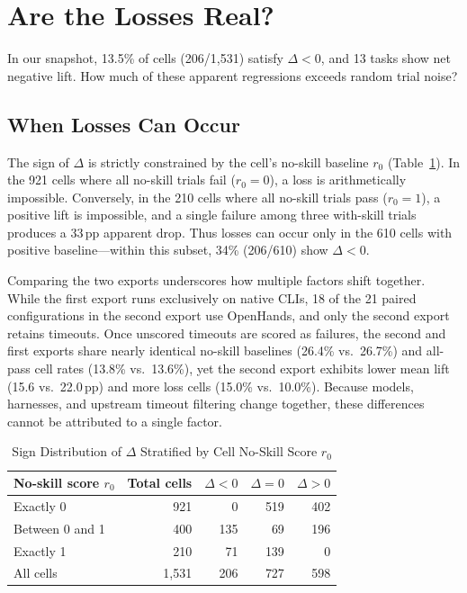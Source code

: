 \documentclass[10pt,conference]{IEEEtran}
\begin{document}
\section{Are the Losses Real?}
\label{sec:loss}
In our snapshot, 13.5\% of cells (206/1,531) satisfy $\Delta<0$, and 13 tasks show net negative lift. How much of these apparent regressions exceeds random trial noise?

\subsection{When Losses Can Occur}
The sign of $\Delta$ is strictly constrained by the cell's no-skill baseline $r_{0}$ (Table~\ref{tab:sign}). In the 921 cells where all no-skill trials fail ($r_{0}=0$), a loss is arithmetically impossible. Conversely, in the 210 cells where all no-skill trials pass ($r_{0}=1$), a positive lift is impossible, and a single failure among three with-skill trials produces a 33\,pp apparent drop. Thus losses can occur only in the 610 cells with positive baseline---within this subset, 34\% (206/610) show $\Delta<0$.

Comparing the two exports underscores how multiple factors shift together. While the first export runs exclusively on native CLIs, 18 of the 21 paired configurations in the second export use OpenHands, and only the second export retains timeouts. Once unscored timeouts are scored as failures, the second and first exports share nearly identical no-skill baselines (26.4\% vs.\ 26.7\%) and all-pass cell rates (13.8\% vs.\ 13.6\%), yet the second export exhibits lower mean lift (15.6 vs.\ 22.0\,pp) and more loss cells (15.0\% vs.\ 10.0\%). Because models, harnesses, and upstream timeout filtering change together, these differences cannot be attributed to a single factor.

\begin{table}[t]
\caption{Sign Distribution of $\Delta$ Stratified by Cell No-Skill Score $r_{0}$}
\label{tab:sign}
\centering
\begin{tabular}{@{}lrrrr@{}}
\toprule
No-skill score $r_{0}$ & Total cells & $\Delta<0$ & $\Delta=0$ & $\Delta>0$ \\
\midrule
Exactly 0 & 921 & 0 & 519 & 402 \\
Between 0 and 1 & 400 & 135 & 69 & 196 \\
Exactly 1 & 210 & 71 & 139 & 0 \\
\midrule
All cells & 1,531 & 206 & 727 & 598 \\
\bottomrule
\end{tabular}
\end{table}
\end{document}
